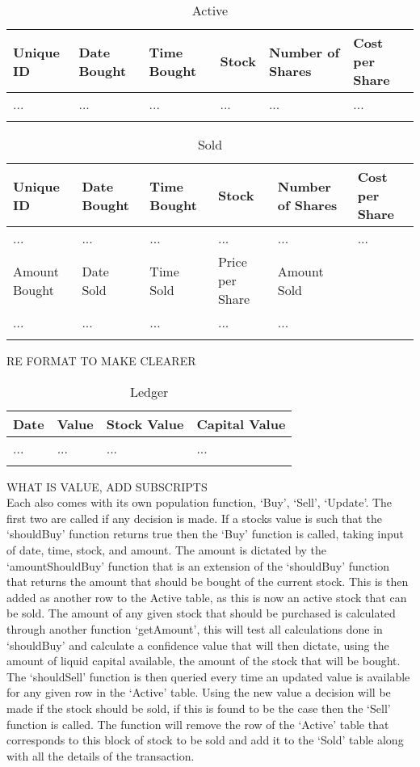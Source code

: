 \documentclass[12pt,a4paper]{article}
\begin{document}
\label{units}
\begin{longtable}{ |p{2.25cm}|p{2.25cm}|p{2.25cm}|p{2.25cm}|p{2.25cm}|p{2.25cm}| }\hline\hline
Unique ID & Date Bought & Time Bought & Stock & Number of Shares & Cost per Share \\ \hline
... & ... & ... & ... & ... & ... \\ \hline
\caption{Active}
\end{longtable}

\label{units}
\begin{longtable}{ |p{2.25cm}|p{2.25cm}|p{2.25cm}|p{2.25cm}|p{2.25cm}|p{2.25cm}| }\hline\hline
Unique ID & Date Bought & Time Bought & Stock & Number of Shares & Cost per Share \\ \hline
... & ... & ... & ... & ... & ... \\ \hline
Amount Bought & Date Sold & Time Sold & Price per Share & Amount Sold & \\ \hline
... & ... & ... & ... & ... &  \\ \hline
\caption{Sold}
\end{longtable}

RE FORMAT TO MAKE CLEARER \\

\label{units}
\begin{longtable}{ |p{2.25cm}|p{2.25cm}|p{2.25cm}|p{2.25cm}| }\hline\hline
Date & Value & Stock Value & Capital Value \\ \hline
... & ... & ... & ...  \\ \hline
\caption{Ledger}
\end{longtable}

WHAT IS VALUE, ADD SUBSCRIPTS \\ 

Each also comes with its own population function, `Buy', `Sell', `Update'. The first two are called if any decision is made. If a stocks value is such that the `shouldBuy' function returns true then the `Buy' function is called, taking input of date, time, stock, and amount. The amount is dictated by the `amountShouldBuy' function that is an extension of the `shouldBuy' function that returns the amount that should be bought of the current stock. This is then added as another row to the Active table, as this is now an active stock that can be sold. The amount of any given stock that should be purchased is calculated through another function `getAmount', this will test all calculations done in `shouldBuy' and calculate a confidence value that will then dictate, using the amount of liquid capital available, the amount of the stock that will be bought. The `shouldSell' function is then queried every time an updated value is available for any given row in the `Active' table. Using the new value a decision will be made if the stock should be sold, if this is found to be the case then the `Sell' function is called. The function will remove the row of the `Active' table that corresponds to this block of stock to be sold and add it to the `Sold' table along with all the details of the transaction. \\
\end{document}
